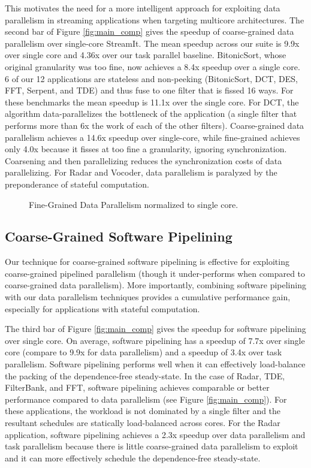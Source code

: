 This motivates the need for a more intelligent approach for exploiting
data parallelism in streaming applications when targeting multicore
architectures.  The second bar of Figure \ref{fig:main_comp} gives the
speedup of coarse-grained data parallelism over single-core
StreamIt. The mean speedup across our suite is 9.9x over single core
and 4.36x over our task parallel baseline.  BitonicSort, whose
original granularity was too fine, now achieves a 8.4x speedup over a
single core. 6 of our 12 applications are stateless and non-peeking
(BitonicSort, DCT, DES, FFT, Serpent, and TDE) and thus fuse to one
filter that is fissed 16 ways.  For these benchmarks the mean speedup
is 11.1x over the single core.  For DCT, the algorithm
data-parallelizes the bottleneck of the application (a single filter
that performs more than 6x the work of each of the other filters).
Coarse-grained data parallelism achieves a 14.6x speedup over
single-core, while fine-grained achieves only 4.0x because it fisses
at too fine a granularity, ignoring synchronization.  Coarsening and
then parallelizing reduces the synchronization costs of data
parallelizing.  For Radar and Vocoder, data parallelism is paralyzed
by the preponderance of stateful computation.

\begin{figure}[t]
\centering
\vspace{-6pt}
\caption{Fine-Grained Data Parallelism normalized to single core.
\protect\label{fig:fine_data}}
\vspace{-6pt}
\end{figure}

\subsection{Coarse-Grained Software Pipelining}

Our technique for coarse-grained software pipelining is effective for
exploiting coarse-grained pipelined parallelism (though it
under-performs when compared to coarse-grained data parallelism).
More importantly, combining software pipelining with our data
parallelism techniques provides a cumulative performance gain,
especially for applications with stateful computation.

The third bar of Figure \ref{fig:main_comp} gives the speedup for
software pipelining over single core.  On average, software pipelining
has a speedup of 7.7x over single core (compare to 9.9x for data
parallelism) and a speedup of 3.4x over task parallelism. Software
pipelining performs well when it can effectively load-balance the
packing of the dependence-free steady-state.  In the case of Radar,
TDE, FilterBank, and FFT, software pipelining achieves comparable or
better performance compared to data parallelism (see Figure
\ref{fig:main_comp}).  For these applications, the workload is not
dominated by a single filter and the resultant schedules are
statically load-balanced across cores.  For the Radar application,
software pipelining achieves a 2.3x speedup over data parallelism and
task parallelism because there is little coarse-grained data
parallelism to exploit and it can more effectively schedule the
dependence-free steady-state.

